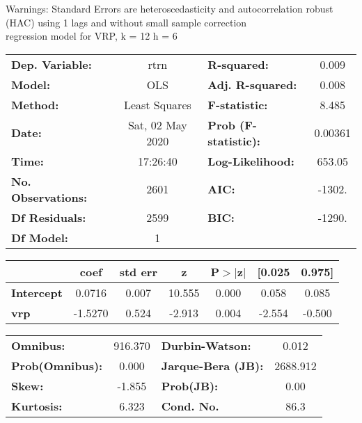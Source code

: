 Warnings: \newline
 [1] Standard Errors are heteroscedasticity and autocorrelation robust (HAC) using 1 lags and without small sample correction\\ 

regression model for VRP, k = 12 h = 6\begin{center}
\begin{tabular}{lclc}
\toprule
\textbf{Dep. Variable:}    &       rtrn       & \textbf{  R-squared:         } &     0.009   \\
\textbf{Model:}            &       OLS        & \textbf{  Adj. R-squared:    } &     0.008   \\
\textbf{Method:}           &  Least Squares   & \textbf{  F-statistic:       } &     8.485   \\
\textbf{Date:}             & Sat, 02 May 2020 & \textbf{  Prob (F-statistic):} &  0.00361    \\
\textbf{Time:}             &     17:26:40     & \textbf{  Log-Likelihood:    } &    653.05   \\
\textbf{No. Observations:} &        2601      & \textbf{  AIC:               } &    -1302.   \\
\textbf{Df Residuals:}     &        2599      & \textbf{  BIC:               } &    -1290.   \\
\textbf{Df Model:}         &           1      & \textbf{                     } &             \\
\bottomrule
\end{tabular}
\begin{tabular}{lcccccc}
                   & \textbf{coef} & \textbf{std err} & \textbf{z} & \textbf{P$> |$z$|$} & \textbf{[0.025} & \textbf{0.975]}  \\
\midrule
\textbf{Intercept} &       0.0716  &        0.007     &    10.555  &         0.000        &        0.058    &        0.085     \\
\textbf{vrp}       &      -1.5270  &        0.524     &    -2.913  &         0.004        &       -2.554    &       -0.500     \\
\bottomrule
\end{tabular}
\begin{tabular}{lclc}
\textbf{Omnibus:}       & 916.370 & \textbf{  Durbin-Watson:     } &    0.012  \\
\textbf{Prob(Omnibus):} &   0.000 & \textbf{  Jarque-Bera (JB):  } & 2688.912  \\
\textbf{Skew:}          &  -1.855 & \textbf{  Prob(JB):          } &     0.00  \\
\textbf{Kurtosis:}      &   6.323 & \textbf{  Cond. No.          } &     86.3  \\
\bottomrule
\end{tabular}
\end{center}

